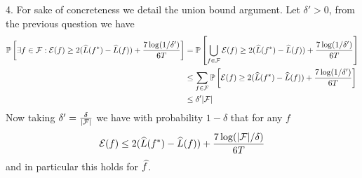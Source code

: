 \begin{solution}[]
4. For sake of concreteness we detail the union bound argument. Let $\delta' >0$, from the previous question we have
\begin{align*}
\mathbb{P}\left[\exists f \in \mathcal{F}:\mathcal{E}(f)\geq 2( \widehat L(f^*)- \widehat L(f))+\frac{7\log(1/\delta')}{6T}\right]&=   \mathbb{P}\left[\bigcup_{f\in\mathcal{F}}\mathcal{E}(f) \geq 2( \widehat L(f^*)- \widehat L(f))+\frac{7\log(1/\delta')}{6T}\right]\\
&\leq \sum_{f\in\mathcal{F}}  \mathbb{P}\left[\mathcal{E}(f) \geq 2( \widehat L(f^*)- \widehat L(f))+\frac{7\log(1/\delta')}{6T}\right]\\
&\leq \delta' |\mathcal{F}|
\end{align*} 
 Now taking $\delta'=\frac{\delta}{|\mathcal{F}|}$ we have with probability $1-\delta$ that for any $f$
 \[ \mathcal{E}(f) \leq 2( \widehat L(f^*)- \widehat L(f))+\frac{7\log(|\mathcal{F}|/\delta)}{6T}\]
 and in particular this holds for $\widehat f$.
\end{solution}
